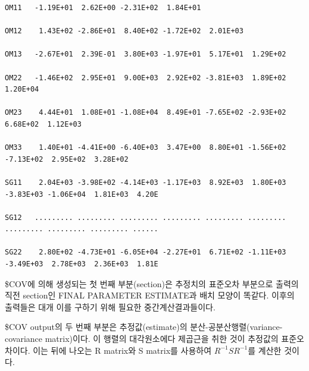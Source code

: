 \documentclass[
  10pt,
]{krantz}
\begin{document}
\begin{verbatim}
OM11   -1.19E+01  2.62E+00 -2.31E+02  1.84E+01                                                         
                                                                                                       
OM12    1.43E+02 -2.86E+01  8.40E+02 -1.72E+02  2.01E+03                                               
                                                                                                       
OM13   -2.67E+01  2.39E-01  3.80E+03 -1.97E+01  5.17E+01  1.29E+02                                     
                                                                                                       
OM22   -1.46E+02  2.95E+01  9.00E+03  2.92E+02 -3.81E+03  1.89E+02  1.20E+04                           
                                                                                                       
OM23    4.44E+01  1.08E+01 -1.08E+04  8.49E+01 -7.65E+02 -2.93E+02  6.68E+02  1.12E+03                 
                                                                                                       
OM33    1.40E+01 -4.41E+00 -6.40E+03  3.47E+00  8.80E+01 -1.56E+02 -7.13E+02  2.95E+02  3.28E+02       
                                                                                                       
SG11    2.04E+03 -3.98E+02 -4.14E+03 -1.17E+03  8.92E+03  1.80E+03 -3.83E+03 -1.06E+04  1.81E+03  4.20E
                                                                                                       
SG12   ......... ......... ......... ......... ......... ......... ......... ......... ......... ......
                                                                                                       
SG22    2.80E+02 -4.73E+01 -6.05E+04 -2.27E+01  6.71E+02 -1.11E+03 -3.49E+03  2.78E+03  2.36E+03  1.81E
\end{verbatim}

\$COV에 의해 생성되는 첫 번째 부분(section)은 추정치의 표준오차 부분으로 출력의 직전 section인 FINAL PARAMETER ESTIMATE과 배치 모양이 똑같다. 이후의 출력들은 대개 이를 구하기 위해 필요한 중간계산결과들이다.

\$COV output의 두 번째 부분은 추정값(estimate)의 분산-공분산행렬(variance-covariance matrix)이다. 이 행렬의 대각원소에다 제곱근을 취한 것이 추정값의 표준오차이다. 이는 뒤에 나오는 R matrix와 S matrix를 사용하여 \(R^{- 1}SR^{- 1}\)를 계산한 것이다.
\end{document}
